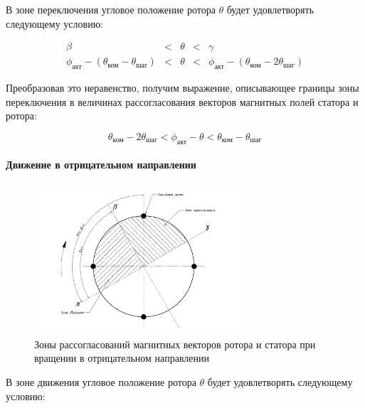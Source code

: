В зоне переключения угловое положение ротора $\theta$ будет удовлетворять следующему условию:

\begin{equation}
    \label{switch_zone_posit_move_for_curr_pos}
    \begin{array}{ccccc}
        \beta & < & \theta & < & \gamma                                         \\
        \phi_\textit{акт} - (\theta_\textit{ком} - \theta_\textit{шаг}) & < & \theta
        & < &\phi_\textit{акт} - (\theta_\textit{ком} - 2\theta_\textit{шаг})
    \end{array}
\end{equation}

Преобразовав это неравенство, получим выражение, описывающее границы зоны переключения
в величинах рассогласования векторов магнитных полей статора и ротора:

\begin{equation}
    \label{switch_zone_posit_move_for_delta}
    \theta_\textit{ком} - 2\theta_\textit{шаг} < \phi_\textit{акт} - \theta
    < \theta_\textit{ком} - \theta_\textit{шаг}
\end{equation}


\paragraph{Движение в отрицательном направлении}
\begin{figure}
    \centering
    \includegraphics[width=0.7\textwidth, keepaspectratio]
                    {./src/pictures/feedback_control/pole_switch_zones_with_negative_dir}
    \caption{Зоны рассогласований магнитных векторов ротора и статора при вращении в отрицательном направлении}
    \label{pole_switch_zones_with_negative_dir}
\end{figure}

В зоне движения угловое положение ротора $\theta$ будет удовлетворять следующему условию:

